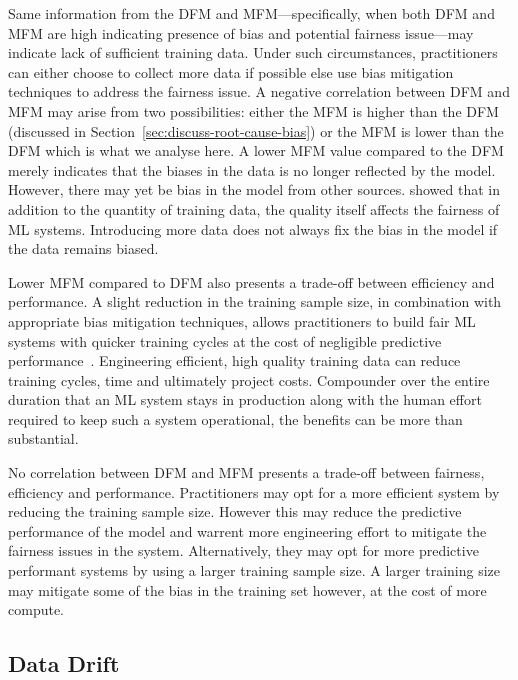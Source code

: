 \documentclass{article}
\begin{document}
Same information from the DFM and MFM---specifically, when both DFM
and MFM are high indicating presence of bias and potential fairness
issue---may indicate lack of sufficient training data. Under such
circumstances, practitioners can either choose to collect more data if
possible else use bias mitigation techniques to address the fairness
issue. A negative correlation between DFM and MFM may arise from two
possibilities: either the MFM is higher than the DFM (discussed in
Section \ref{sec:discuss-root-cause-bias}) or the MFM is lower than
the DFM which is what we analyse here. A lower MFM value compared to
the DFM merely indicates that the biases in the data is no longer
reflected by the model. However, there may yet be bias in the model
from other sources. \citeauthor{zhang2021ignorance} showed that in
addition to the quantity of training data, the quality itself affects
the fairness of ML systems. Introducing more data does not always fix
the bias in the model if the data remains biased.

Lower MFM compared to DFM also presents a trade-off between
efficiency and performance. A slight reduction in the training sample
size, in combination with appropriate bias mitigation techniques,
allows practitioners to build fair ML systems with quicker training
cycles at the cost of negligible predictive performance \cite{CITEME}.
Engineering efficient, high quality training data can reduce training
cycles, time and ultimately project costs. Compounder over the entire
duration that an ML system stays in production along with the human
effort required to keep such a system operational, the benefits can be
more than substantial.

No correlation between DFM and MFM presents a trade-off between
fairness, efficiency and performance. Practitioners may opt for a more
efficient system by reducing the training sample size. However this
may reduce the predictive performance of the model and warrent more
engineering effort to mitigate the fairness issues in the system.
Alternatively, they may opt for more predictive performant systems by
using a larger training sample size. A larger training size may
mitigate some of the bias in the training set however, at the cost of
more compute.

\subsection{Data Drift}\label{sec:discuss-data-drift}
\end{document}
